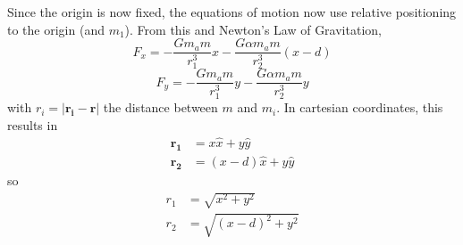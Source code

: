 \documentclass[preprint,titlepage,preprintnumbers,amsmath,amssymb,aps,11pt]{revtex4-2}
\begin{document}
Since the origin is now fixed, the equations of motion now use relative positioning to the origin (and $m_1$). From this and Newton's Law of Gravitation,
\begin{equation}
    F_x=-\frac{Gm_a m}{r_1^3}x-\frac{G\alpha m_a m}{r_2^3}(x-d)
    \label{eq:fx}
\end{equation}
\begin{equation}
    F_y=-\frac{Gm_a m}{r_1^3}y-\frac{G\alpha m_a m}{r_2^3}y
    \label{eq:fy}
\end{equation}
with $r_i=|\bm{r_i}-\bm{r}|$ the distance between $m$ and $m_i$. In cartesian coordinates, this results in
\begin{equation}
    \begin{aligned}
        \bm{r_1} & =x\hat{x}+y\hat{y}     \\
        \bm{r_2} & =(x-d)\hat{x}+y\hat{y}
    \end{aligned}
\end{equation}
so
\begin{equation}
    \begin{aligned}
        r_1 & =\sqrt{x^2+y^2}     \\
        r_2 & =\sqrt{(x-d)^2+y^2}
    \end{aligned}
\end{equation}
\end{document}

